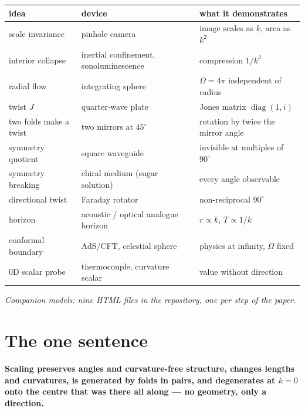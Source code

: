 \documentclass[11pt,fleqn]{article}
\begin{document}
\begin{table}[H]
\centering
\small
\begin{tabular}{@{}llp{5.4cm}@{}}
\toprule
idea & device & what it demonstrates \\
\midrule
scale invariance & pinhole camera & image scales as $k$, area as $k^2$ \\
interior collapse & inertial confinement, sonoluminescence & compression $1/k^3$ \\
radial flow & integrating sphere & $\Omega = 4\pi$ independent of radius \\
twist $J$ & quarter-wave plate & Jones matrix $\operatorname{diag}(1, i)$ \\
two folds make a twist & two mirrors at $45^\circ$ & rotation by twice the mirror angle \\
symmetry quotient & square waveguide & invisible at multiples of $90^\circ$ \\
symmetry breaking & chiral medium (sugar solution) & every angle observable \\
directional twist & Faraday rotator & non-reciprocal $90^\circ$ \\
horizon & acoustic / optical analogue horizon & $r \propto k$, $T \propto 1/k$ \\
conformal boundary & AdS/CFT, celestial sphere & physics at infinity, $\Omega$ fixed \\
0D scalar probe & thermocouple, curvature scalar & value without direction \\
\bottomrule
\end{tabular}
\end{table}

\medskip
\begin{center}
\small
\emph{Companion models: nine HTML files in the repository, one per step of the paper.}
\end{center}

\section{The one sentence}

\textbf{Scaling preserves angles and curvature-free structure, changes lengths and curvatures, is
generated by folds in pairs, and degenerates at $k = 0$ onto the centre that was there all along ---
no geometry, only a direction.}
\end{document}
